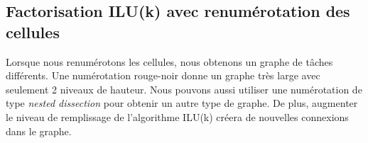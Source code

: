 \subsection{Factorisation ILU(k) avec renumérotation des cellules}
Lorsque nous renumérotons les cellules, nous obtenons un graphe de tâches différents.
%
Une numérotation rouge-noir donne un graphe très large avec seulement 2 niveaux de hauteur.
%
Nous pouvons aussi utiliser une numérotation de type {\em nested dissection} pour obtenir un autre type de graphe.
%
De plus, augmenter le niveau de remplissage de l'algorithme ILU(k) créera de nouvelles connexions dans le graphe.
%
